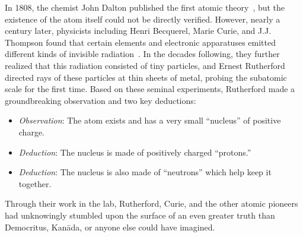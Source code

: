 \begin{dissertationintroduction}
In 1808, the chemist John Dalton published the first\footnotemark{} atomic theory~\cite{Dalton1805, Dalton1808}, but the existence of the atom itself could not be directly verified. 
However, nearly a century later, physicists including Henri Becquerel, Marie Curie, and J.J. Thompson found that certain elements and electronic apparatuses emitted different kinds of invisible radiation~\cite{Becquerel, Curie, RADVANYI2017544, Thompson}. 
In the decades following, they further realized that this radiation consisted of tiny particles\footnotemark{}, and Ernest Rutherford directed rays of these particles at thin sheets of metal, probing the subatomic scale for the first time. 
Based on these seminal experiments, Rutherford made a groundbreaking observation and two key deductions: 
\begin{itemize}
    \item \textit{Observation}: The atom exists\footnotemark{} and has a very small ``nucleus'' of positive charge.
    \item \textit{Deduction}: The nucleus is made of positively charged ``protons.''
    \item \textit{Deduction}: The nucleus is also made of ``neutrons'' which help keep it together.
\end{itemize}
Through their work in the lab, Rutherford, Curie, and the other atomic pioneers had unknowingly stumbled upon the surface of an even greater truth than Democritus, Kan\=ada, or anyone else could have imagined. 


\end{dissertationintroduction}
